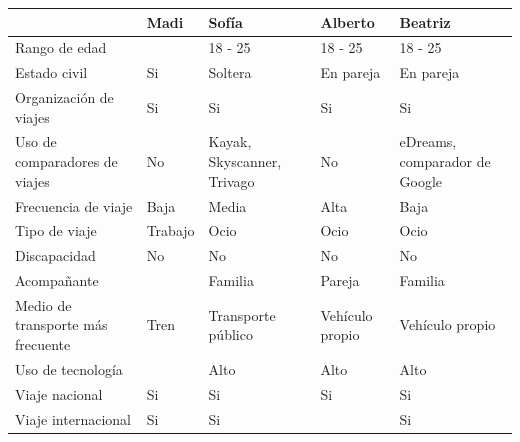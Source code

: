 \begin{table}[H]
    \centering
    \begin{tabular}{p{10em}|p{7em}|p{7em}|p{7em}|p{8em}|}
        \cline{2-5}
                                          & Madi        & Sofía                          & Alberto            & Beatriz                         \\ \hline
        Rango de edad                     &             & 18 - 25                        & 18 - 25            & 18 - 25                         \\ \hline
        Estado civil                      & Si          & Soltera                        & En pareja          & En pareja                       \\ \hline
        Organización de viajes            & Si          & Si                             & Si                 & Si                              \\ \hline
        Uso de comparadores de viajes     & No          & Kayak, Skyscanner, Trivago     & No                 & eDreams, comparador de Google   \\ \hline
        Frecuencia de viaje               & Baja        & Media                          & Alta               & Baja                            \\ \hline
        Tipo de viaje                     & Trabajo     & Ocio                           & Ocio               & Ocio                            \\ \hline
        Discapacidad                      & No          & No                             & No                 & No                              \\ \hline
        Acompañante                       &             & Familia                        & Pareja             & Familia                         \\ \hline
        Medio de transporte más frecuente & Tren        & Transporte público             & Vehículo propio    & Vehículo propio                 \\ \hline
        Uso de tecnología                 &             & Alto                           & Alto               & Alto                            \\ \hline
        Viaje nacional                    & Si          & Si                             & Si                 & Si                              \\ \hline
        Viaje internacional               & Si          & Si                             &                    & Si                              \\ \hline

\end{tabular}
\end{table}
